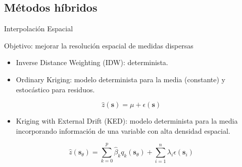 \documentclass[xcolor={usenames,svgnames,dvipsnames}]{beamer}
\begin{document}
\subsection{Métodos híbridos}
\label{sec:org5728801}

\begin{frame}[label={sec:org356b815}]{Interpolación Espacial}
\begin{block}{\alert{Objetivo}: mejorar la resolución espacial de medidas dispersas}
\begin{itemize}
\item \alert{Inverse Distance Weighting (IDW)}: determinista.

\item \alert{Ordinary Kriging}: modelo determinista para la media (constante) y estocástico para residuos.
\end{itemize}

\[
  \hat{z}(\mathbf{s}) = \mu + \epsilon(\mathbf{s})
\]

\begin{itemize}
\item \alert{Kriging with External Drift (KED)}: modelo determinista para la media incorporando información de una variable con alta densidad espacial.
\end{itemize}
\[  \hat{z}(\mathbf{s}_\theta) =  \sum_{k=0}^p \hat{\beta}_k q_k(\mathbf{s}_\theta) + 
  \sum_{i=1}^n \lambda_i \epsilon(\mathbf{s}_i)
\]

\nocite{Journee.Bertrand2010}
\nocite{Antonanzas-Torres.Canizares.ea2013}
\nocite{Bojanowski.Vrieling.ea2013}
\end{block}
\end{frame}
\end{document}
